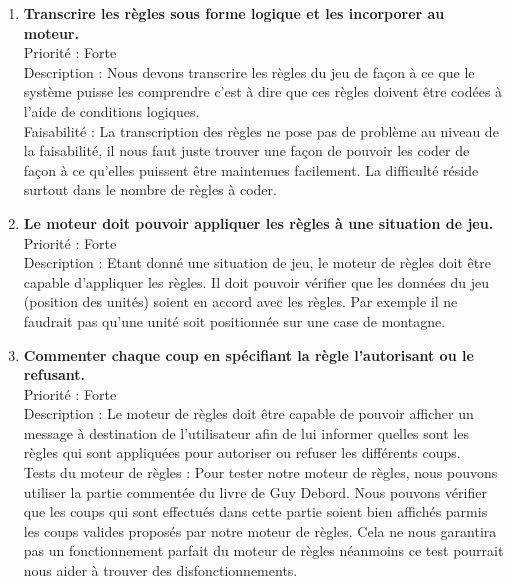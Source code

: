 \documentclass[12pt]{article}
\begin{document}
			\begin{enumerate}

				\item \textbf{Transcrire les règles sous forme logique et les incorporer au moteur.} \\[0.7\baselineskip]
				Priorité : Forte \\[0.7\baselineskip]
				Description : Nous devons transcrire les règles du jeu de façon à ce que le système puisse les comprendre c'est à dire que ces règles doivent être codées à l'aide de conditions logiques. \\[0.7\baselineskip]
				Faisabilité : La transcription des règles ne pose pas de problème au niveau de la faisabilité, il nous faut juste trouver une façon de pouvoir les coder de façon à ce qu'elles puissent être maintenues facilement. La difficulté réside surtout dans le nombre de règles à coder. \\[0.7\baselineskip]
				
				\item \textbf{Le moteur doit pouvoir appliquer les règles à une situation de jeu.} \\[0.7\baselineskip]
				Priorité : Forte \\[0.7\baselineskip]
				Description : Etant donné une situation de jeu, le moteur de règles doit être capable d'appliquer les règles. Il doit pouvoir vérifier que les données du jeu (position des unités) soient en accord avec les règles. Par exemple il ne faudrait pas qu'une unité soit positionnée sur une case de montagne. \\[0.7\baselineskip]

				\item \textbf{Commenter chaque coup en spécifiant la règle l'autorisant ou le refusant.} \\[0.7\baselineskip]
				Priorité : Forte \\[0.7\baselineskip]
				Description : Le moteur de règles doit être capable de pouvoir afficher un message à destination de l'utilisateur afin de lui informer quelles sont les règles qui sont appliquées pour autoriser ou refuser les différents coups. \\[0.7\baselineskip]

				Tests du moteur de règles : Pour tester notre moteur de règles, nous pouvons utiliser la partie commentée du livre de Guy Debord. Nous pouvons vérifier que les coups qui sont effectués dans cette partie soient bien affichés parmis les coups valides proposés par notre moteur de règles. Cela ne nous garantira pas un fonctionnement parfait du moteur de règles néanmoins ce test pourrait nous aider à trouver des disfonctionnements. \\[0.7\baselineskip]
				
			\end{enumerate}
\end{document}
